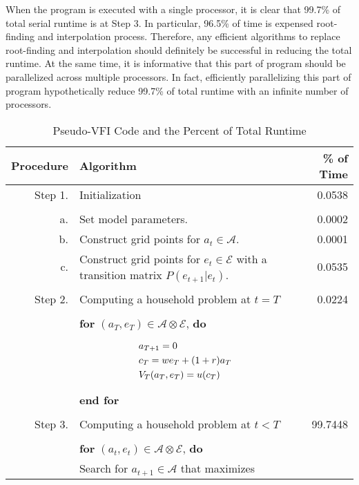 \documentclass[12pt]{article}
\begin{document}
When the program is executed with a single processor, it is clear that 99.7\% of total serial runtime is at Step 3. In particular, 96.5\% of time is expensed root-finding and interpolation process. Therefore, any efficient algorithms to replace root-finding and interpolation should definitely be successful in reducing the total runtime. At the same time, it is informative that this part of program should be parallelized across multiple processors.
In fact, efficiently parallelizing this part of program hypothetically reduce 99.7\% of total runtime with an infinite number of processors.

\begin{table}[h!]
\caption{Pseudo-VFI Code and the Percent of Total Runtime}
\smallskip
\small
\begin{tabular}{r p{12cm} r}\label{tab:vfi_alg}
\textbf{Procedure}& \textbf{Algorithm} & \textbf{\% of Time}\\
\hline
Step 1. &Initialization & 0.0538\\
\hline
\\[-0.7em]
		a.&  Set model parameters. & 0.0002\\
		b.&  Construct grid points for $a_{t} \in \mathcal{A}$. & 0.0001\\
		c.&  Construct grid points for $e_t \in \mathcal{E}$ with a transition matrix $P(e_{t+1}|e_t)$.&0.0535\\
\\[-0.8em]\hline
Step 2. &Computing a household problem at $t=T$ & 0.0224\\
\hline
\\[-0.8em]
		&  \textbf{for} $(a_T, e_T)\in \mathcal{A} \otimes \mathcal{E}$, \textbf{do}\\
[-1.2em]
&\parbox{4cm}{
\begin{align}
&a_{T+1}=0 \notag\\
&c_T = w e_T + (1+r) a_T \notag\\
&V_{T}(a_T,e_T) = u(c_T)\notag
\end{align}}\\
[-0.6em]
&  \textbf{end for}\\
\\[-1.0em]\hline
Step 3. & Computing a household problem at $t<T$  & 99.7448\\
\hline
\\[-0.7em]
		& \textbf{for} $(a_{t},e_{t})\in \mathcal{A} \otimes \mathcal{E}$, \textbf{do}\\
		& \hspace{2em}Search for $a_{t+1}\in \mathcal{A}$ that maximizes\\

\end{tabular}
\end{table}
\end{document}
